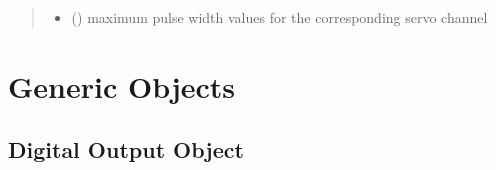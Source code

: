 \documentclass[letterpaper,10pt,english]{sphinxmanual}
\begin{document}
\begin{fulllineitems}
\begin{fulllineitems}
\begin{quote}
\begin{description}
\begin{itemize}
\item {} 
\sphinxAtStartPar
{} (\sphinxstyleliteralemphasis{\sphinxupquote{{[}}}\sphinxstyleliteralemphasis{\sphinxupquote{{]}}}) \textendash{} maximum pulse width values for the corresponding 
servo channel

\end{itemize}

\end{description}\end{quote}

\end{fulllineitems}


\end{fulllineitems}



\section{Generic Objects}
\label{\detokenize{generic:generic-objects}}\label{\detokenize{generic::doc}}

\subsection{Digital Output Object}
\label{\detokenize{generic:module-DigitalOutputObject}}\label{\detokenize{generic:digital-output-object}}
\end{document}
